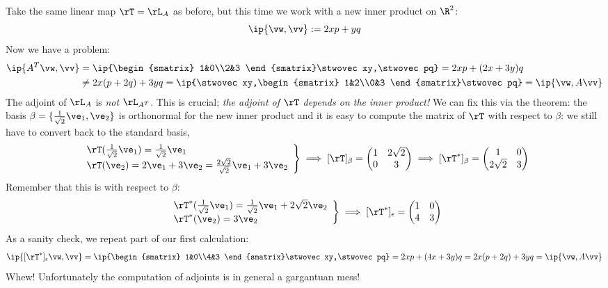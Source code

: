\begin{tcolorbox}[exstyle, title={Example \ref{ex:adjointeasy}, ver.II.\quad}]
Take the same linear map $\rT=\rL_A$ as before, but this time we work with a new inner product on $\R^2$:
\[\ip{\vw,\vv}:=2xp+yq\]
Now we have a problem:
\begin{align*}
\ip{A^T\vw,\vv}
&=\ip{\begin{smatrix}
1&0\\2&3
\end{smatrix}\stwovec xy,\stwovec pq}
=2xp+(2x+3y)q\\
&\neq 2x(p+2q)+3yq
=\ip{\stwovec xy,\begin{smatrix}
1&2\\0&3
\end{smatrix}\stwovec pq}
=\ip{\vw,A\vv}
\end{align*}
The adjoint of $\rL_A$ is \emph{not} $\rL_{A^T}$. This is crucial; \emph{the adjoint of $\rT$ depends on the inner product!}\smallbreak
We can fix this via the theorem: the basis $\beta=\{\frac 1{\sqrt 2}\ve_1,\ve_2\}$ is orthonormal for the new inner product and it is easy to compute the matrix of $\rT$ with respect to $\beta$: we still have to convert back to the standard basis,
\[\left.\begin{array}{ll}
\rT(\tfrac 1{\sqrt 2}\ve_1) = \tfrac 1{\sqrt 2}\ve_1\\
\rT(\ve_2) = 2\ve_1+3\ve_2=\tfrac{2\sqrt 2}{\sqrt 2}\ve_1 +3\ve_2
\end{array}\right\}
\implies [\rT]_\beta=\begin{pmatrix}
1&2\sqrt 2\\0&3
\end{pmatrix}
\implies [\rT^*]_\beta=\begin{pmatrix}
1&0\\2\sqrt 2&3
\end{pmatrix}\]
Remember that this is with respect to $\beta$:
\[\left.\begin{array}{ll}
\rT^*(\tfrac 1{\sqrt 2}\ve_1) = \tfrac 1{\sqrt 2}\ve_1+2\sqrt 2\ve_2\\
\rT^*(\ve_2) = 3\ve_2
\end{array}\right\}
\implies [\rT^*]_\epsilon=\begin{pmatrix}
1&0\\
4&3
\end{pmatrix}
\]
As a sanity check, we repeat part of our first calculation:
\[\ip{[\rT^*]_\epsilon\vw,\vv}
=\ip{\begin{smatrix}
1&0\\4&3
\end{smatrix}\stwovec xy,\stwovec pq}
=2xp+(4x+3y)q = 2x(p+2q)+3yq
=\ip{\vw,A\vv}\]
Whew! Unfortunately the computation of adjoints is in general a gargantuan mess!
\end{tcolorbox}




